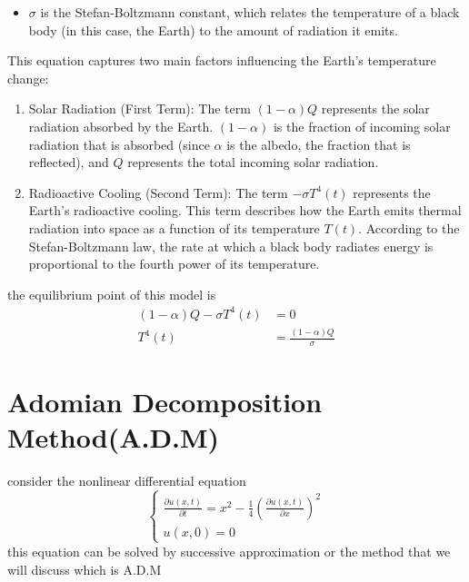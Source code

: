 \documentclass[]{article}
\begin{document}
\begin{itemize}
    \item $\sigma$ is the Stefan-Boltzmann constant, which relates the temperature of a black body (in this case, the Earth) to the amount of radiation it emits.
\end{itemize}
\newpage
This equation captures two main factors influencing the Earth's temperature change:
\begin{enumerate}
    \item Solar Radiation (First Term): The term $(1-\alpha)Q$ represents the solar radiation absorbed by the Earth.
    $(1-\alpha)$ is the fraction of incoming solar radiation that is absorbed (since $\alpha$ is the albedo, the fraction that is reflected), 
    and $Q$ represents the total incoming solar radiation.
    \item Radioactive Cooling (Second Term): The term $-\sigma T^4(t)$ represents the Earth's radioactive cooling. 
    This term describes how the Earth emits thermal radiation into space as a function of its temperature $T(t)$. 
    According to the Stefan-Boltzmann law, the rate at which a black body radiates energy is proportional to the fourth power of its temperature.
\end{enumerate}


the equilibrium point of this model is
\begin{align*}
    (1-\alpha)Q - \sigma T^4(t) &= 0
    \\
    T^4(t) &= \frac{(1-\alpha)Q}{\sigma}
\end{align*}

\section {Adomian Decomposition Method(A.D.M)}

consider the nonlinear differential equation 
\begin{equation}
    \begin{cases}
         \displaystyle \frac{\partial u(x,t)}{\partial t} = x^2 - \frac{1}{4}(\frac{\partial u(x,t)}{\partial x})^2
         \\
         \displaystyle u(x,0) = 0
     \end{cases}
 \end{equation}
this equation can be solved by successive approximation or the method that we will discuss which is A.D.M 
\end{document}
